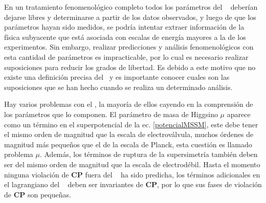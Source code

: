
En un tratamiento fenomenológico completo todos los parámetros del \MSSM~ deberían dejarse libres y determinarse a partir de los datos observados, y luego de que los parámetros hayan sido medidos, se podría intentar extraer información de la física subyacente que está asociada con escalas de energía mayores a la de los experimentos. Sin embargo, realizar predicciones y análisis fenomenológicos con esta cantidad de parámetros es impracticable, por lo cual es necesario realizar suposiciones para reducir los grados de libertad. Es debido a este motivo que no existe una definición precisa del \MSSM ~y es importante conocer cuales son las suposiciones que se han hecho cuando se realiza un determinado análisis.

Hay varios problemas con el \MSSM, la mayoría de ellos cayendo en la comprensión de los parámetros que lo componen. El parámetro de masa de Higgsino $\mu$ aparece como un término en el superpotencial de la ec. \ref{potencialMSSM}, este debe tener el mismo orden de magnitud que la escala de electroválvula, muchos órdenes de magnitud más pequeños que el de la escala de Planck, esta cuestión es llamado problema $\mu$. Además, los términos de ruptura de la supersimetría también deben ser del mismo orden de magnitud que la escala de electrodébil. Hasta el momento ninguna violación de \textbf{CP} fuera del \ME ~ ha sido predicha, los términos adicionales en el lagrangiano del \MSSM ~ deben ser invariantes de \textbf{CP}, por lo que sus fases de violación de \textbf{CP} son pequeñas.


